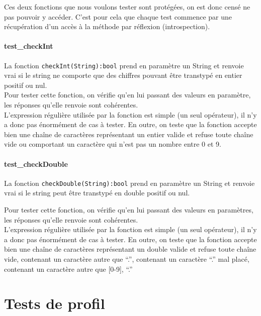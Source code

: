 \documentclass{report}
\begin{document}
Ces deux fonctions que nous voulons tester sont protégées, on est donc censé ne pas pouvoir y accéder. C’est pour cela que chaque test commence par une récupération d’un accès à la méthode par réflexion (introspection).

\paragraph{test\_checkInt}

La fonction \texttt{checkInt(String):bool} prend en paramètre un String et renvoie vrai si le string ne comporte que des chiffres pouvant être transtypé en entier positif ou nul. \\

Pour tester cette fonction, on vérifie qu’en lui passant des valeurs en paramètre, les réponses qu’elle renvoie sont cohérentes. \\

L’expression régulière utilisée par la fonction est simple (un seul opérateur), il n’y a donc pas énormément de cas à tester. En outre, on teste que la fonction accepte bien une chaîne de caractères représentant un entier valide et refuse toute chaîne vide ou  comportant un caractère qui n’est pas un nombre entre 0 et 9.

\paragraph{test\_checkDouble}

La fonction \texttt{checkDouble(String):bool} prend en paramètre un String et renvoie vrai si le string peut être transtypé en double positif ou nul.

Pour tester cette fonction, on vérifie qu’en lui passant des valeurs en paramètres, les réponses qu’elle renvoie sont cohérentes. \\ 

L’expression régulière utilisée par la fonction est simple (un seul opérateur), il n’y a donc pas énormément de cas à tester. En outre, on teste que la fonction accepte bien une chaîne de caractères représentant un double valide et refuse toute chaîne vide, contenant un caractère autre que “.”, contenant un caractère “.” mal placé, contenant un caractère autre que {[0-9], “.”}

\newpage
\section{Tests de profil}
\end{document}
